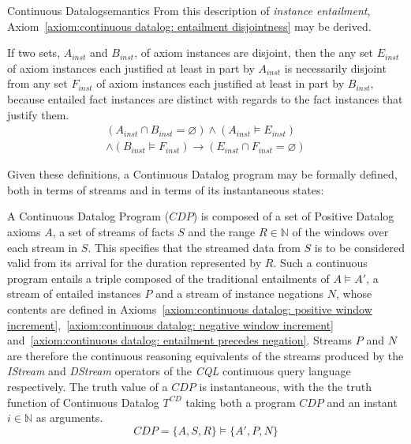\begin{nestedsection}{Continuous Datalog}{semantics}
	From this description of \emph{instance entailment}, Axiom~\ref{axiom:continuous datalog: entailment disjointness} may be derived.

	\begin{axiom}\label{axiom:continuous datalog: entailment disjointness}
		If two sets, $A_{inst}$ and $B_{inst}$, of axiom instances are disjoint, then the any set $E_{inst}$ of axiom instances each justified at least in part by $A_{inst}$ is necessarily disjoint from any set $F_{inst}$ of axiom instances each justified at least in part by $B_{inst}$, because entailed fact instances are distinct with regards to the fact instances that justify them.
		\begin{multline*}
			\left( A_{inst} \cap B_{inst} = \varnothing \right) \wedge \left( A_{inst} \vDash E_{inst} \right) \\
				\wedge \left( B_{inst} \vDash F_{inst} \right) \rightarrow \left( E_{inst} \cap F_{inst} = \varnothing \right)
		\end{multline*}
	\end{axiom}

	Given these definitions, a Continuous Datalog program may be formally defined, both in terms of streams and in terms of its instantaneous states:

	\begin{definition}\label{def:continuous datalog: CDP}
		A Continuous Datalog Program (${CDP}$) is composed of a set of Positive Datalog axioms $A$, a set of streams of facts $S$ and the range ${R \in \mathbb{N}}$ of the windows over each stream in $S$.
		This specifies that the streamed data from $S$ is to be considered valid from its arrival for the duration represented by $R$.
		Such a continuous program entails a triple composed of the traditional entailments of ${A \vDash A'}$, a stream of entailed instances $P$ and a stream of instance negations $N$, whose contents are defined in Axioms~\ref{axiom:continuous datalog: positive window increment},~\ref{axiom:continuous datalog: negative window increment} and~\ref{axiom:continuous datalog: entailment precedes negation}.
		Streams $P$ and $N$ are therefore the continuous reasoning equivalents of the streams produced by the \emph{IStream} and \emph{DStream} operators of the \emph{CQL} continuous query language \citep{CQL} respectively.
		The truth value of a ${CDP}$ is instantaneous, with the the truth function of Continuous Datalog $T^{CD}$ taking both a program ${CDP}$ and an instant ${i \in \mathbb{N}}$ as arguments.
		\begin{equation*}
			CDP = \{A,S,R\} \vDash \{A',P,N\}
		\end{equation*}
	\end{definition}


\end{nestedsection}
